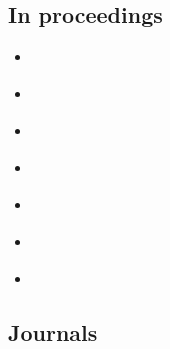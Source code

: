 \subsection{In proceedings}
\begin{itemize}
	\item \cite{chave-64}
	\item \cite{chomsky-73}
	\item \cite{moraux}
	\item \cite{inproceedings-full}
	\item \cite{inproceedings-crossref}
	\item \cite{inproceedings-minimal}
	\item \cite{salam}
\end{itemize}




\subsection{Journals}

